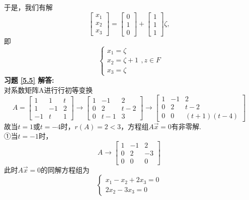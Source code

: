 于是，我们有解
\begin{equation*}
\begin{bmatrix}
x_1\\x_2\\x_3
\end{bmatrix}
=\begin{bmatrix}0\\1\\0\end{bmatrix}+
\begin{bmatrix}1\\1\\1\end{bmatrix}\zeta,
\end{equation*}
即
\begin{equation*}
\begin{cases}
x_1=\zeta\\
x_2=\zeta+1\\
x_3=\zeta
\end{cases},
z\in F
\end{equation*}
\textbf{习题 \ref{5.5} 解答:}\\
对系数矩阵A进行行初等变换
\begin{equation*}
A= \begin{bmatrix}1&1&t\\1&-1&2\\-1&t&1\end{bmatrix}
   \rightarrow
   \begin{bmatrix}1&-1&2\\0&2&t-2\\0&t-1&3\end{bmatrix}
   \rightarrow
   \begin{bmatrix}1&-1&2\\0&2&t-2\\0&0&(t+1)(t-4)\end{bmatrix}
\end{equation*}
故当$t=1$或$t=-4$时，$r(A)=2<3$，方程组$A\vec{x}=0$有非零解.\\
①当$t=-1$时，
\begin{equation*}
A \rightarrow
   \begin{bmatrix}1&-1&2\\0&2&-3\\0&0&0\end{bmatrix}
\end{equation*}
此时$A\vec{x}=0$的同解方程组为
\begin{equation*}
\begin{cases}
x_1-x_2+2x_3=0\\
   2x_2-3x_3=0
\end{cases}
\end{equation*}
